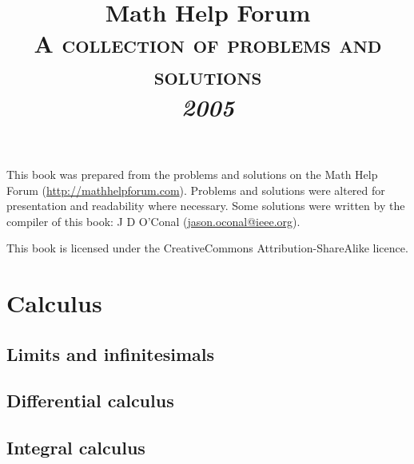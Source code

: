 \documentclass[a4paper,makeidx]{book}
\makeatletter
\renewcommand\tableofcontents{%
    \if@twocolumn
      \@restonecoltrue\onecolumn
    \else
      \@restonecolfalse
    \fi
    \chapter*{\contentsname}%
        \@mkboth{%
           \MakeUppercase\contentsname}{\MakeUppercase\contentsname}%
    \@starttoc{toc}%
    \if@restonecol\twocolumn\fi
    }
\makeatother
\begin{document}
	\title{Math Help Forum\\\vspace{12pt}\Large\textsc{A collection of problems and solutions}\vspace{24pt}\\\vspace{24pt}\Huge\textit{2005}}
	\author{}
	\date{}

	\maketitle

	This book was prepared from the problems and solutions on the Math Help Forum (\url{http://mathhelpforum.com}). Problems and solutions were altered for presentation and readability where necessary. Some solutions were written by the compiler of this book: J D O'Conal (\url{jason.oconal@ieee.org}).

	This book is licensed under the CreativeCommons Attribution-ShareAlike licence.

	\vspace{24pt}

	\begin{center}\Huge\bysa\normalsize\end{center}

    \tableofcontents

	\part{Calculus}

		\chapter{Limits and infinitesimals}

			

		\chapter{Differential calculus}

			
			
			

		\chapter{Integral calculus}
\end{document}
